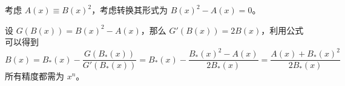 考虑 $A(x) \equiv B(x)^2$，考虑转换其形式为 $B(x)^2 - A(x) = 0$。

设 $G(B(x)) = B(x)^2 - A(x)$，那么 $G'(B(x)) = 2B(x)$，利用公式可以得到
\[
B(x) = B_*(x) - \frac{G(B_*(x))}{G'(B_*(x))} = B_*(x) - \frac{B_*(x)^2 - A(x)}{2B_*(x)} = \frac{A(x) + B_*(x)^2}{2B_*(x)}
\]
所有精度都需为 $x^n$。